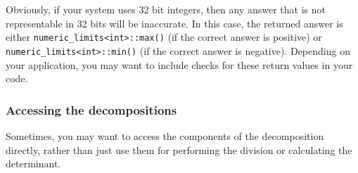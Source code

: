 \documentclass[twoside,letterpaper,11pt]{article}
\renewcommand{\tt}[1]{{\lstinline {#1}}}
\begin{document}
Obviously, if your system uses 32 bit integers, then any answer that is not representable in
32 bits will be inaccurate.  In this case, the returned answer is either \tt{numeric_limits<int>::max()}
(if the correct answer is positive) or \tt{numeric_limits<int>::min()} (if the correct answer is
negative).  Depending on your application, you may want to include checks for these return values
in your code.


\subsubsection{Accessing the decompositions}
\label{Matrix_Division_Access}

Sometimes, you may want to access the components of the decomposition directly,
rather than just use them for performing the division or calculating the determinant.
\end{document}
